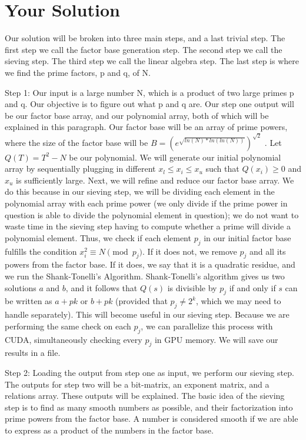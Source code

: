\documentclass[11pt,twocolumn]{article}
\begin{document}
\section {Your Solution}\label{soln}
Our solution will be broken into three main steps, and a last trivial step. The first step we call the factor base generation step. The second step we call the sieving step. The third step we call the linear algebra step. The last step is where we find the prime factors, p and q, of N.

Step 1: Our input is a large number N, which is a product of two large primes p and q. Our objective is to figure out what p and q are. Our step one output will be our factor base array, and our polynomial array, both of which will be explained in this paragraph. Our factor base will be an array of prime powers, where the size of the factor base will be $B = (e^{\sqrt{ln(N)*ln(ln(N))}})^{\sqrt{2}}$ \cite{hoffstein:cryptography}.
Let $Q(T) = T^2 - N$ be our polynomial. We will generate our initial polynomial array by sequentially plugging in different $x_l \leq x_i \leq x_u$ such that $Q(x_i) \geq 0$ and $x_u$ is sufficiently large. Next, we will refine and
reduce our factor base array. We do this because in our sieving step, we will be dividing each element in the polynomial array with each prime power (we only divide if the prime power in question is able to divide the polynomial element in question); we do not want to waste time in the sieving step having to compute  whether a prime will divide a polynomial element. Thus, we check if each element $p_j$ in our initial factor base fulfills the condition $x_i^2 \equiv N \pmod{p_j}$. If it does not, we remove $p_j$ and all its powers from the factor base. If it does, we say that it is a quadratic residue, and we run the Shank-Tonelli's Algorithm. Shank-Tonelli's algorithm gives us two solutions $a$ and $b$, and it follows that $Q(s)$ is divisible by $p_j$ if and only if $s$ can be written as $a + pk$ or $b + pk$ (provided that $p_j \neq 2^k$, which we may need to handle separately). This will become useful in our sieving step. Because we are performing the same check on each $p_j$, we can parallelize this process with CUDA, simultaneously checking every $p_j$ in GPU memory. We will save our results in a file.


Step 2: Loading the output from step one as input, we perform our sieving step. The outputs for step two will be a bit-matrix, an exponent matrix, and a relations array. These outputs will be explained. The basic idea of the sieving step is to find as many smooth numbers as possible, and their factorization into prime powers from the factor base. A number is considered smooth if we are able to express as a product of the numbers in the factor base.
\end{document}

